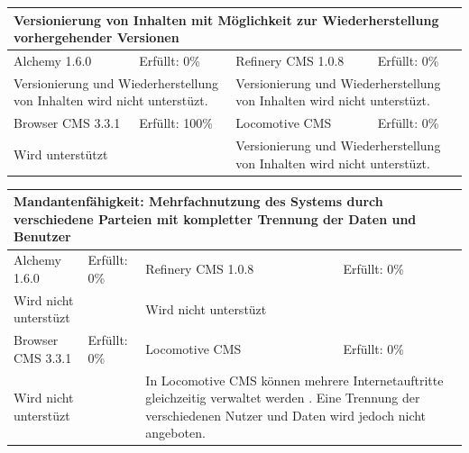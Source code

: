 \newline
\newline
\newline
\begin{tabular}[!ht]{|l|l|l|l|}
\hline
\multicolumn{4}{|p{15cm}|}{\textbf{Versionierung von Inhalten mit Möglichkeit zur Wiederherstellung vorhergehender Versionen}} \\
\hline
  Alchemy 1.6.0 & \cellcolor{red}Erfüllt: 0\% & Refinery CMS 1.0.8 & \cellcolor{red}Erfüllt: 0\% \\
  \hline
  \multicolumn{2}{|p{7.5cm}|}{Versionierung und Wiederherstellung von Inhalten wird nicht unterstüzt.} & \multicolumn{2}{p{7.5cm}|}{Versionierung und Wiederherstellung von Inhalten wird nicht unterstüzt.} \\
  \hline
  Browser CMS 3.3.1 & \cellcolor{green}Erfüllt: 100\% & Locomotive CMS & \cellcolor{red}Erfüllt: 0\% \\
  \hline
  \multicolumn{2}{|p{7.5cm}|}{Wird unterstützt} & \multicolumn{2}{p{7.5cm}|}{Versionierung und Wiederherstellung von Inhalten wird nicht unterstüzt.} \\
\hline
\end{tabular}
\newline
\newline
\newline
\begin{tabular}[!ht]{|l|l|l|l|}
\hline
\multicolumn{4}{|p{15cm}|}{\textbf{Mandantenfähigkeit: Mehrfachnutzung des Systems durch verschiedene Parteien mit kompletter Trennung der Daten und Benutzer}} \\
\hline
  Alchemy 1.6.0 & \cellcolor{red}Erfüllt: 0\% & Refinery CMS 1.0.8 & \cellcolor{red}Erfüllt: 0\% \\
  \hline
  \multicolumn{2}{|p{7.5cm}|}{Wird nicht unterstüzt} & \multicolumn{2}{p{7.5cm}|}{Wird nicht unterstüzt} \\
  \hline
  Browser CMS 3.3.1 & \cellcolor{red}Erfüllt: 0\% & Locomotive CMS & \cellcolor{red}Erfüllt: 0\% \\
  \hline
  \multicolumn{2}{|p{7.5cm}|}{Wird nicht unterstüzt} & \multicolumn{2}{p{7.5cm}|}{In Locomotive CMS können mehrere Internetauftritte gleichzeitig verwaltet werden . Eine Trennung der verschiedenen Nutzer und Daten wird jedoch nicht angeboten.} \\
\hline
\end{tabular}
\newline
\newline
\newline
